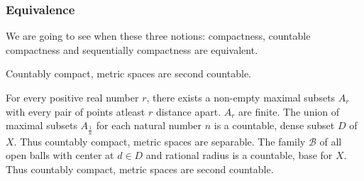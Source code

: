 \subsubsection{Equivalence}
	We are going to see when these three notions: compactness, countable compactness and sequentially compactness are equivalent.

\begin{theorem}
	Countably compact, metric spaces are second countable.
\end{theorem}
\begin{synopsis}
	For every positive real number $r$,   there exists a non-empty maximal subsets $A_r$ with every pair of points atleast $r$ distance apart. $A_r$ are finite. The union of maximal subsets $A_\frac{1}{n}$ for each natural number $n$ is a countable, dense subset $D$ of $X$. Thus countably compact, metric spaces are separable. The family $\mathcal{B}$ of all open balls with center at $d \in D$ and rational radius is a countable, base for $X$. Thus countably compact, metric spaces are second countable.
\end{synopsis}
